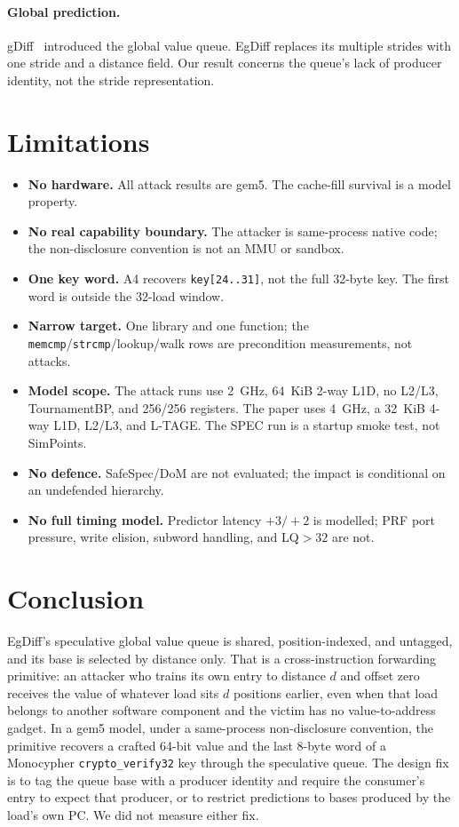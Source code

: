 \documentclass[conference]{IEEEtran}
\newcommand{\code}[1]{\texttt{\small #1}}
\begin{document}
\paragraph{Global prediction.}
gDiff~\cite{gdiff} introduced the global value queue. EgDiff replaces its
multiple strides with one stride and a distance field. Our result
concerns the queue's lack of producer identity, not the stride
representation.

\section{Limitations}

\begin{itemize}
\item \textbf{No hardware.} All attack results are gem5. The cache-fill
survival is a model property.
\item \textbf{No real capability boundary.} The attacker is same-process
native code; the non-disclosure convention is not an MMU or sandbox.
\item \textbf{One key word.} A4 recovers \code{key[24..31]}, not the full
32-byte key. The first word is outside the 32-load window.
\item \textbf{Narrow target.} One library and one function; the
\code{memcmp}/\code{strcmp}/lookup/walk rows are precondition
measurements, not attacks.
\item \textbf{Model scope.} The attack runs use 2~GHz, 64~KiB 2-way L1D,
no L2/L3, TournamentBP, and 256/256 registers. The paper uses 4~GHz, a
32~KiB 4-way L1D, L2/L3, and L-TAGE. The SPEC run is a startup smoke
test, not SimPoints.
\item \textbf{No defence.} SafeSpec/DoM are not evaluated; the impact is
conditional on an undefended hierarchy.
\item \textbf{No full timing model.} Predictor latency $+3/+2$ is
modelled; PRF port pressure, write elision, subword handling, and
LQ$>32$ are not.
\end{itemize}

\section{Conclusion}

EgDiff's speculative global value queue is shared, position-indexed, and
untagged, and its base is selected by distance only. That is a
cross-instruction forwarding primitive: an attacker who trains its own
entry to distance $d$ and offset zero receives the value of whatever
load sits $d$ positions earlier, even when that load belongs to another
software component and the victim has no value-to-address gadget. In a
gem5 model, under a same-process non-disclosure convention, the primitive
recovers a crafted 64-bit value and the last 8-byte word of a Monocypher
\code{crypto\_verify32} key through the speculative queue. The design fix
is to tag the queue base with a producer identity and require the
consumer's entry to expect that producer, or to restrict predictions to
bases produced by the load's own PC. We did not measure either fix.
\end{document}
